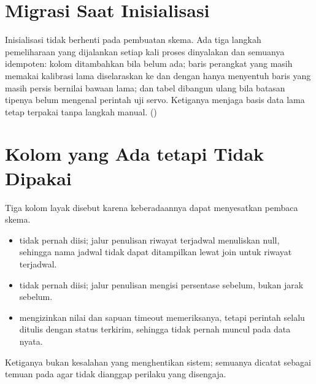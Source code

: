 \section{Migrasi Saat Inisialisasi}

Inisialisasi tidak berhenti pada pembuatan skema. Ada tiga langkah pemeliharaan yang
dijalankan setiap kali proses dinyalakan dan semuanya idempoten: kolom
 ditambahkan bila belum ada; baris perangkat yang masih memakai
kalibrasi lama diselaraskan ke \HopperFull{} dan \HopperEmpty{} dengan hanya
menyentuh baris yang masih persis bernilai bawaan lama; dan tabel 
dibangun ulang bila batasan tipenya belum mengenal perintah uji servo. Ketiganya
menjaga basis data lama tetap terpakai tanpa langkah manual.
()

\section{Kolom yang Ada tetapi Tidak Dipakai}

Tiga kolom layak disebut karena keberadaannya dapat menyesatkan pembaca skema.
\begin{itemize}[leftmargin=*,itemsep=2pt]
  \item {} tidak pernah diisi; jalur penulisan riwayat
        terjadwal menuliskan null, sehingga nama jadwal tidak dapat ditampilkan
        lewat join untuk riwayat terjadwal.
  \item {} tidak pernah diisi; jalur penulisan
        mengisi persentase sebelum, bukan jarak sebelum.
  \item {} mengizinkan nilai  dan sapuan timeout
        memeriksanya, tetapi perintah selalu ditulis dengan status terkirim,
        sehingga  tidak pernah muncul pada data nyata.
\end{itemize}

Ketiganya bukan kesalahan yang menghentikan sistem; semuanya dicatat sebagai temuan
pada  agar tidak dianggap perilaku yang disengaja.
